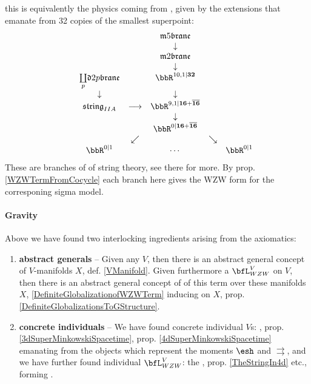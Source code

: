 this is equivalently the physics coming from , given by the extensions that emanate from 32 copies of the smallest superpoint:
\begin{displaymath}
\itexarray{
&& && \mathfrak{m}5\mathfrak{brane}
\\
&& && \downarrow
\\
&& && \mathfrak{m}2\mathfrak{brane}
\\
&& && \downarrow
\\
&& \underset{p}{\coprod} \mathfrak{d}{2p}\mathfrak{brane} && \bbR^{10,1|\mathbf{32}}
\\
&& \downarrow && \downarrow
\\
&& \mathfrak{string}_{IIA} &\longrightarrow & \bbR^{9,1|\mathbf{16}+\overline{\mathbf{16}}}
\\
&& && \downarrow
\\
&& && \bbR^{0|\mathbf{16}+\overline{\mathbf{16}}}
\\
&& & \swarrow && \searrow
\\
&& \bbR^{0|1} && \cdots  && \bbR^{0|1}
}
\end{displaymath}
These are branches of  of string theory, see there for more. By prop. \ref{WZWTermFromCocycle} each branch here gives the WZW form for the corresponing  sigma model.
\hypertarget{gravity}{}\paragraph*{{Gravity}}\label{gravity}
Above we have found two interlocking ingredients arising from the axiomatics:
\begin{enumerate}%
\item \textbf{abstract generals} -- Given any  $V$, then there is an abstract general concept of $V$-manifolds $X$, def. \ref{VManifold}. Given furthermore a  $\bfL_{WZW}^V$ on $V$, then there is an abstract general concept of  of this term over these manifolds $X$, \ref{DefiniteGlobalizationofWZWTerm} inducing  on $X$, prop. \ref{DefiniteGlobalizationsToGStructure}.
\item \textbf{concrete individuals} -- We have found concrete individual $V$s: , prop. \ref{3dSuperMinkowskiSpacetime}, prop. \ref{4dSuperMinkowskiSpacetime} emanating from the objects which represent the moments $\esh $ and $\rightrightarrows$, and we have further found individual $\bfL_{WZW}^V$: the , prop. \ref{TheStringIn4d} etc., forming .
\end{enumerate}

